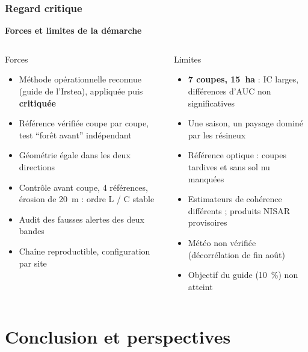 \documentclass[aspectratio=169]{beamer}
\newcommand{\slidesubtitle}[1]{%
	\textcolor{myblue}{\small\textbf{#1}}%
	\par\vspace{3pt}%
}
\begin{document}
\begin{frame}{\phantom{x}}
	\frametitle{Regard critique}
	\vspace{-4pt}\slidesubtitle{Forces et limites de la démarche}
	\small
	\begin{columns}[T]
		\begin{exampleblock}{Forces}
			\footnotesize
			\begin{itemize}
				\setlength{\itemsep}{1pt}
				\item Méthode opérationnelle reconnue (guide de l'Irstea), appliquée puis \textbf{critiquée}
				\item Référence vérifiée coupe par coupe, test \enquote{forêt avant} indépendant
				\item Géométrie égale dans les deux directions
				\item Contrôle avant coupe, 4 références, érosion de 20~m : ordre L / C stable
				\item Audit des fausses alertes des deux bandes
				\item Chaîne reproductible, configuration par site
			\end{itemize}
		\end{exampleblock}

		\begin{alertblock}{Limites}
			\footnotesize
			\begin{itemize}
				\setlength{\itemsep}{1pt}
				\item \textbf{7 coupes, 15~ha} : IC larges, différences d'AUC non significatives
				\item Une saison, un paysage dominé par les résineux
				\item Référence optique : coupes tardives et sans sol nu manquées
				\item Estimateurs de cohérence différents ; produits NISAR provisoires
				\item Météo non vérifiée (décorrélation de fin août)
				\item Objectif du guide (10~\%) non atteint
			\end{itemize}
		\end{alertblock}
	\end{columns}
\end{frame}

\section{Conclusion et perspectives}
\end{document}
